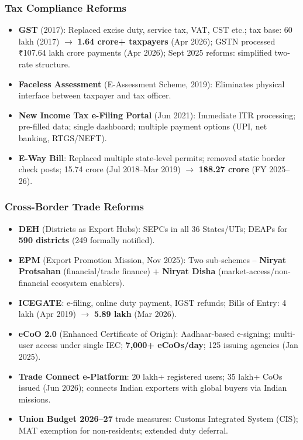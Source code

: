 \subsubsection*{Tax Compliance Reforms}
\begin{itemize}
  \item \textbf{GST} (2017): Replaced excise duty, service tax, VAT, CST etc.; tax base: 60 lakh (2017) $\rightarrow$ \textbf{1.64 crore+ taxpayers} (Apr 2026); GSTN processed ₹107.64 lakh crore payments (Apr 2026); Sept 2025 reforms: simplified two-rate structure.
  \item \textbf{Faceless Assessment} (E-Assessment Scheme, 2019): Eliminates physical interface between taxpayer and tax officer.
  \item \textbf{New Income Tax e-Filing Portal} (Jun 2021): Immediate ITR processing; pre-filled data; single dashboard; multiple payment options (UPI, net banking, RTGS/NEFT).
  \item \textbf{E-Way Bill}: Replaced multiple state-level permits; removed static border check posts; 15.74 crore (Jul 2018--Mar 2019) $\rightarrow$ \textbf{188.27 crore} (FY 2025--26).
\end{itemize}

\subsubsection*{Cross-Border Trade Reforms}
\begin{itemize}
  \item \textbf{DEH} (Districts as Export Hubs): SEPCs in all 36 States/UTs; DEAPs for \textbf{590 districts} (249 formally notified).
  \item \textbf{EPM} (Export Promotion Mission, Nov 2025): Two sub-schemes -- \textbf{Niryat Protsahan} (financial/trade finance) + \textbf{Niryat Disha} (market-access/non-financial ecosystem enablers).
  \item \textbf{ICEGATE}: e-filing, online duty payment, IGST refunds; Bills of Entry: 4 lakh (Apr 2019) $\rightarrow$ \textbf{5.89 lakh} (Mar 2026).
  \item \textbf{eCoO 2.0} (Enhanced Certificate of Origin): Aadhaar-based e-signing; multi-user access under single IEC; \textbf{7,000+ eCoOs/day}; 125 issuing agencies (Jan 2025).
  \item \textbf{Trade Connect e-Platform}: 20 lakh+ registered users; 35 lakh+ CoOs issued (Jun 2026); connects Indian exporters with global buyers via Indian missions.
  \item \textbf{Union Budget 2026--27} trade measures: Customs Integrated System (CIS); MAT exemption for non-residents; extended duty deferral.
\end{itemize}

